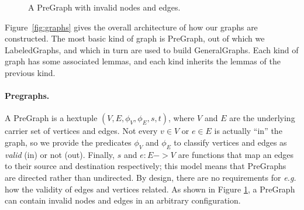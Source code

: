 \begin{figure}[t]
\centering
{}
\endpgfgraphicnamed
\vspace{1ex}
\caption{A PreGraph with invalid nodes and edges.}\label{fig:pregraph}
\end{figure}

Figure~\ref{fig:graphs} gives the overall architecture of how our graphs are constructed.
The most basic kind of graph is PreGraph, out of which we LabeledGraphs, and which in turn are used
to build GeneralGraphs.  Each kind of graph has some associated lemmas, and each kind inherits the lemmas of the previous kind.  %

\paragraph{Pregraphs.} A PreGraph is a hextuple $(V, E, \phi_V, \phi_E, s, t)$,
where $V$ and $E$ are the underlying carrier set of vertices and edges.  Not every $v \in V$ or $e \in E$ is actually ``in'' the graph, so we provide the predicates $\phi_V$ and $\phi_E$ to classify vertices and edges as \emph{valid} (in) or not (out).  Finally, $s$ and $e : E -> V$ are functions that map an edges to their source and destination respectively; this model means that PreGraphs are directed rather than undirected.  By design, there are no requirements for \emph{e.g.} how the validity of edges and vertices related.  As shown in Figure \ref{fig:pregraph}, a PreGraph can contain invalid nodes and edges in an arbitrary configuration.

